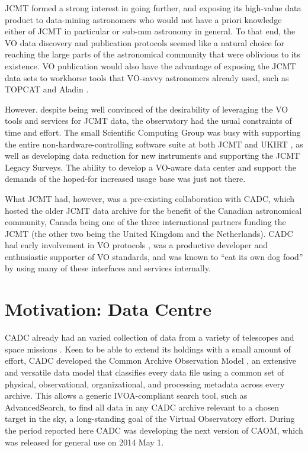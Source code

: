 \documentclass[final,authoryear,5p,times,twocolumn]{elsarticle}
\begin{document}
JCMT formed a strong interest in going further, and exposing its
high-value data product to data-mining astronomers who would not have
a priori knowledge either of JCMT in particular or sub-mm astronomy in
general. To that end, the VO data discovery and publication protocols
seemed like a natural choice for reaching the large parts of the
astronomical community that were oblivious to its existence. VO
publication would also have the advantage of exposing the JCMT data
sets to workhorse tools that VO-savvy astronomers already used, such
as TOPCAT \citep[][]{2005ASPC..347...29T} and Aladin
\citep[][]{2005ASPC..347..193O}.

However. despite being well convinced of the desirability of
leveraging the VO tools and services for JCMT data, the observatory
had the usual constraints of time and effort. The small Scientific
Computing Group was busy with supporting the entire non-hardware-controlling
software suite at both JCMT and UKIRT \citep[see e.g.,][with both
telescopes operated by the same organization]{2002SPIE.4844..321E,2011tfa..confE..42J},
as well as developing data reduction for new instruments
and supporting the JCMT Legacy Surveys. The ability to develop a
VO-aware data center and support the demands of the hoped-for
increased usage base was just not there.

What JCMT had, however, was a pre-existing collaboration with CADC,
which hosted the older JCMT data archive \citep{1997ASPC..125..397T}
for the benefit of the Canadian astronomical community, Canada being
one of the three international partners funding the JCMT (the other
two being the United Kingdom and the Netherlands). CADC had early
involvement in VO protocols \citep{2002ASPC..281...36S}, was a
productive developer and enthusiastic supporter of VO standards, and
was known to ``eat its own dog food'' by using many of these
interfaces and services internally.

\section{Motivation: Data Centre}

CADC already had an varied collection of data from a variety of
telescopes and space missions
\citep{1994ASPC...61..123C,2008SPIE.7016E..16G}. Keen to be able to
extend its holdings with a small amount of effort, CADC developed
the Common Archive Observation Model
\citep[CAOM:][]{2007ASPC..376..347D,2008ASPC..394..426D}, an extensive and
versatile data model that classifies every data file using a common set of physical,
observational, organizational, and processing metadata across every archive.
This allows a generic IVOA-compliant search tool, such as AdvancedSearch, to find all data
in any CADC archive relevant to a chosen target in the sky, a long-standing goal of the
Virtual Observatory effort.  During the period reported here CADC was developing
the next version of CAOM, which was released for general use on 2014 May 1.
\end{document}
